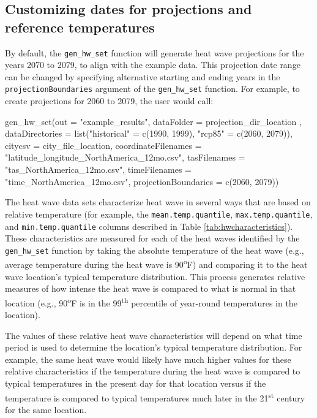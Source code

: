 \subsection{Customizing dates for projections and reference
temperatures}\label{customizing-dates-for-projections-and-reference-temperatures}

By default, the \texttt{gen\_hw\_set} function will generate heat wave
projections for the years 2070 to 2079, to align with the example data.
This projection date range can be changed by specifying alternative
starting and ending years in the \texttt{projectionBoundaries} argument
of the \texttt{gen\_hw\_set} function. For example, to create
projections for 2060 to 2079, the user would call:

\begin{Schunk}
\begin{Sinput}
gen_hw_set(out = "example_results",
           dataFolder = projection_dir_location ,
           dataDirectories = list("historical" = c(1990, 1999),
                                        "rcp85" = c(2060, 2079)),
           citycsv = city_file_location,
           coordinateFilenames = "latitude_longitude_NorthAmerica_12mo.csv",
           tasFilenames = "tas_NorthAmerica_12mo.csv",
           timeFilenames = "time_NorthAmerica_12mo.csv",
           projectionBoundaries = c(2060, 2079))
\end{Sinput}
\end{Schunk}

The heat wave data sets characterize heat wave in several ways that are
based on relative temperature (for example, the
\texttt{mean.temp.quantile}, \texttt{max.temp.quantile}, and
\texttt{min.temp.quantile} columns described in Table
\ref{tab:hwcharacteristics}). These characteristics are measured for
each of the heat waves identified by the \texttt{gen\_hw\_set} function
by taking the absolute temperature of the heat wave (e.g., average
temperature during the heat wave is 90\textsuperscript{o}F) and
comparing it to the heat wave location's typical temperature
distribution. This process generates relative measures of how intense
the heat wave is compared to what is normal in that location (e.g.,
90\textsuperscript{o}F is in the 99\textsuperscript{th} percentile of
year-round temperatures in the location).

The values of these relative heat wave characteristics will depend on
what time period is used to determine the location's typical temperature
distribution. For example, the same heat wave would likely have much
higher values for these relative characteristics if the temperature
during the heat wave is compared to typical temperatures in the present
day for that location versus if the temperature is compared to typical
temperatures much later in the 21\textsuperscript{st} century for the
same location.

